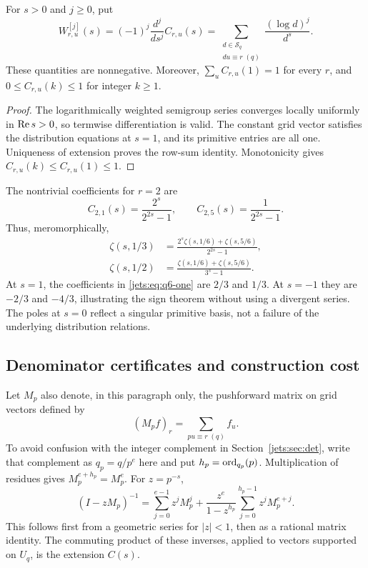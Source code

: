 \begin{corollary}\label{jets:cor:monotone}
For $s>0$ and $j\ge0$, put
\begin{equation}\label{jets:eq:W-definition}
 W_{r,u}^{[j]}(s)=(-1)^j\frac{d^j}{ds^j}C_{r,u}(s)
 =\sum_{\substack{d\in\mathcal S_q\\du\equiv r\;(q)}}
 \frac{(\log d)^j}{d^s}.
\end{equation}
These quantities are nonnegative. Moreover,
$\sum_u C_{r,u}(1)=1$ for every $r$, and
$0\le C_{r,u}(k)\le1$ for integer $k\ge1$.
\end{corollary}
\begin{proof}
The logarithmically weighted semigroup series converges locally
uniformly in $\operatorname{Re} s>0$, so termwise differentiation is valid.
The constant grid vector satisfies the distribution equations at
$s=1$, and its primitive entries are all one. Uniqueness of extension
proves the row-sum identity. Monotonicity gives
$C_{r,u}(k)\le C_{r,u}(1)\le1$.
\end{proof}

\begin{example}\label{jets:ex:q6}
The nontrivial coefficients for $r=2$ are
\[
 C_{2,1}(s)=\frac{2^s}{2^{2s}-1},\qquad
 C_{2,5}(s)=\frac1{2^{2s}-1}.
\]
Thus, meromorphically,
\begin{align}
 \zeta(s,1/3)&=
 \frac{2^s\zeta(s,1/6)+\zeta(s,5/6)}{2^{2s}-1},\label{jets:eq:q6-one}\\
 \zeta(s,1/2)&=
 \frac{\zeta(s,1/6)+\zeta(s,5/6)}{3^s-1}.
 \label{jets:eq:q6-two}
\end{align}
At $s=1$, the coefficients in \eqref{jets:eq:q6-one} are $2/3$ and $1/3$.
At $s=-1$ they are $-2/3$ and $-4/3$, illustrating the sign theorem
without using a divergent series. The poles at $s=0$ reflect a
singular primitive basis, not a failure of the underlying distribution
relations.
\end{example}

\subsection{Denominator certificates and construction cost}
Let $M_p$ also denote, in this paragraph only, the pushforward matrix
on grid vectors defined by
\[
 (M_pf)_r=\sum_{pu\equiv r\;(q)}f_u.
\]
To avoid confusion with the integer complement in
Section~\ref{jets:sec:det}, write that complement as $q_p=q/p^e$ here and
put $h_p=\operatorname{ord}_{q_p}(p)$. Multiplication of residues gives
$M_p^{e+h_p}=M_p^e$. For $z=p^{-s}$,
\begin{equation}\label{jets:eq:operator-inverse}
 (I-zM_p)^{-1}
 =\sum_{j=0}^{e-1}z^jM_p^j
 +\frac{z^e}{1-z^{h_p}}\sum_{j=0}^{h_p-1}z^jM_p^{e+j}.
\end{equation}
This follows first from a geometric series for $|z|<1$, then as a
rational matrix identity. The commuting product of these inverses,
applied to vectors supported on $U_q$, is the extension $C(s)$.

